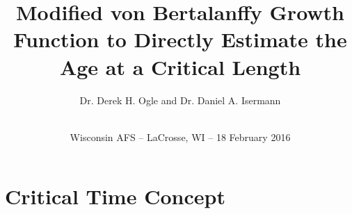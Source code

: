 \documentclass[xcolor=dvipsnames]{beamer}\usepackage[]{graphicx}\usepackage[]{color}
\begin{document}
\title[Critical Time from Modified VBGF]{Modified von Bertalanffy Growth Function to Directly Estimate the Age at a Critical Length}
\author[Ogle \& Isermann]{Dr. Derek H. Ogle  and Dr. Daniel A. Isermann }
\date[WI AFS 2016]{ \\[2\baselineskip] Wisconsin AFS -- LaCrosse, WI -- 18 February 2016}
\maketitle




\section{Critical Time Concept}
\end{document}
